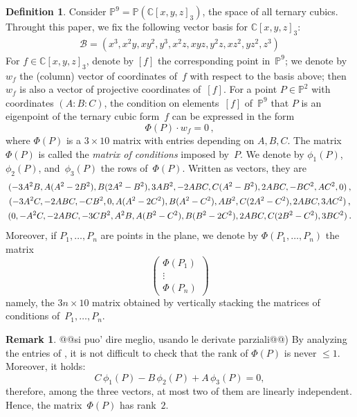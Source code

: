 \documentclass[11pt, a4paper, reqno, captions=tableheading,bibliography=totoc]{scrartcl}
\theoremstyle{plain}
\theoremstyle{definition}
\newtheorem{definition}[lemma]{Definition}
\newtheorem{rmk}[lemma]{Remark}
\newcommand{\C}{\mathbb{C}}
\newcommand{\p}{\mathbb{P}}
\newcommand\scalemath[2]{\scalebox{#1}{\mbox{\ensuremath{\displaystyle #2}}}}
\begin{document}
\begin{definition}
\label{definition:matrix_conditions}
 Consider $\p^9 = \p(\C[x,y,z]_3)$, the space of all ternary cubics.
 Throught this paper, we fix the following vector basis for $\C[x,y,z]_3$:
 \begin{eqnarray}
  \mathcal{B} = (x^3, x^2 y, x y^2, y^3, x^2 z, x y z, y^2 z, x z^2, y z^2, z^3)
  \label{vector_basis}
 \end{eqnarray}
 For $f \in \C[x,y,z]_3$, denote by $[f]$ the corresponding point in~$\p^9$; we denote by $w_f$ the (column) vector of coordinates of~$f$ with respect to the basis above; then $w_f$ is also a vector of projective coordinates of~$[f]$.
 For a point $P \in \p^2$ with coordinates $(A: B: C)$, the condition on elements~$[f]$ of~$\p^9$ that $P$ is an eigenpoint of the ternary cubic form~$f$ can be expressed in the form
 \[
  \Phi(P) \cdot w_f
  = 0 \,,
 \]
 where $\Phi(P)$ is a $3 \times 10$ matrix with entries depending on $A, B, C$.
 The matrix $\Phi(P)$ is called the \emph{matrix of conditions} imposed by~$P$.
We denote by $\phi_1(P)$, $\phi_2(P)$, and~$\phi_3(P)$ the rows of~$\Phi(P)$.
Written as vectors, they are
%
\begin{equation}
\label{equation:matrix_conditions_rows}
\begin{gathered}
\scalemath{0.9}{(-3A^2B, A(A^2 - 2B^2), B(2A^2 - B^2), 3AB^2,
 -2ABC, C(A^2 - B^2), 2 ABC,
 -B  C^2, A  C^2, 0)} \,, \\
\scalemath{0.9}{(-3A^2 C,
-2ABC,
-CB^2,
0,
A(A^2-2C^2),
B(A^2 - C^2),
AB^2,
C(2A^2-C^2),
2ABC,
3AC^2)} \,,\\
\scalemath{0.9}{(0,
-A^2C,
-2ABC,
-3CB^2,
A^2 B,
A(B^2 - C^2),
B(B^2-2C^2),
2ABC,
C(2B^2-C^2),
3BC^2)} \,.
\end{gathered}
\end{equation}
%
Moreover, if $P_1, \dotsc, P_n$ are points in the plane, we denote by $\Phi(P_1, \dotsc, P_n)$ the matrix
%
\[
 \left(
 \begin{array}{c}
  \Phi(P_1) \\
  \vdots \\
  \Phi(P_n)
 \end{array}
 \right)
\]
%
namely, the $3n \times 10$ matrix obtained by vertically stacking the matrices of conditions of~$P_1, \dotsc, P_n$.
\end{definition}

\begin{rmk} @@si puo' dire meglio, usando le derivate parziali@@)
By analyzing the entries of , it is not difficult to check that the rank of
$\Phi(P)$ is never $\leq 1$.
Moreover, it holds:
\begin{equation}
  C \, \phi_1(P) - B \, \phi_2(P) + A \, \phi_3(P) = 0,
  \label{eq:base}
\end{equation}
therefore,
among the three vectors, at most two of them are linearly independent.
Hence, the matrix~$\Phi(P)$ has rank~$2$.
\end{rmk}
\end{document}

